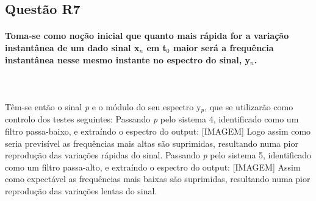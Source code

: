 \documentclass[a4paper,12pt]{article}
\begin{document}
		\subsection{Questão R7}
			\paragraph{Toma-se como noção inicial que quanto mais rápida for a variação instantânea de um dado sinal x$_n$ em t$_0$ maior será a frequência instantânea nesse mesmo instante no espectro do sinal, y$_n$.} \mbox{} \\ \mbox{} \\
			Têm-se então o sinal \textit{p} e o módulo do seu espectro y$_p$, que se utilizarão como controlo dos testes seguintes:
			Passando \textit{p} pelo sistema 4, identificado como um filtro passa-baixo, e extraíndo o espectro do output:
			[IMAGEM]
			Logo assim como seria previsível as frequências mais altas são suprimidas, resultando numa pior reprodução das variações rápidas do sinal.
			Passando \textit{p} pelo sistema 5, identificado como um filtro passa-alto, e extraíndo o espectro do output:
                        [IMAGEM]
                        Assim como expectável as frequências mais baixas são suprimidas, resultando numa pior reprodução das variações lentas do sinal.
\end{document}
